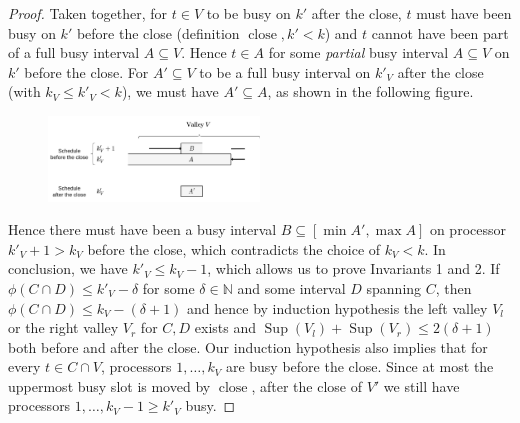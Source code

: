 \documentclass[a4paper]{article}
\DeclareMathOperator{\close}{close}
\DeclareMathOperator{\res}{Sup}
\begin{document}
\begin{proof}
      Taken together, for $t \in V$ to be busy on $k'$ after the close, $t$ must have been busy on $k'$ before the close (definition $\close, k' < k$) and $t$ cannot have been part of a full busy interval $A \subseteq V$.
      Hence $t \in A$ for some \emph{partial} busy interval $A \subseteq V$ on $k'$ before the close.
      For $A' \subseteq V$ to be a full busy interval on $k'_V$ after the close (with $k_V \leq k'_V < k$), we must have $A' \subseteq A$, as shown in the following figure.
      \begin{figure}[H]
        \centering
        \includegraphics[width=0.5\textwidth]{graphics/invariant_case1.jpg}


      \end{figure}
      Hence there must have been a busy interval $B \subseteq [\min A', \max A]$ on processor $k'_V + 1 > k_V$ before the close, which contradicts the choice of $k_V < k$.
      In conclusion, we have $k'_V \leq k_V - 1$, which allows us to prove Invariants 1 and 2.
      If $\phi(C \cap D) \leq k'_{V} - \delta$ for some $\delta \in \mathbb{N}$ and some interval $D$ spanning $C$, then $\phi(C \cap D) \leq k_V - (\delta + 1)$ and hence by induction hypothesis the left valley $V_l$ or the right valley $V_r$ for $C, D$ exists and $\res(V_l) + \res(V_r) \leq 2 (\delta + 1)$ both before and after the close.
      Our induction hypothesis also implies that for every $t \in C \cap V$, processors $1, \ldots, k_V$ are busy before the close.
      Since at most the uppermost busy slot is moved by $\close$, after the close of $V'$ we still have processors $1, \ldots, k_V - 1 \geq k'_V$ busy.


\end{proof}
\end{document}
